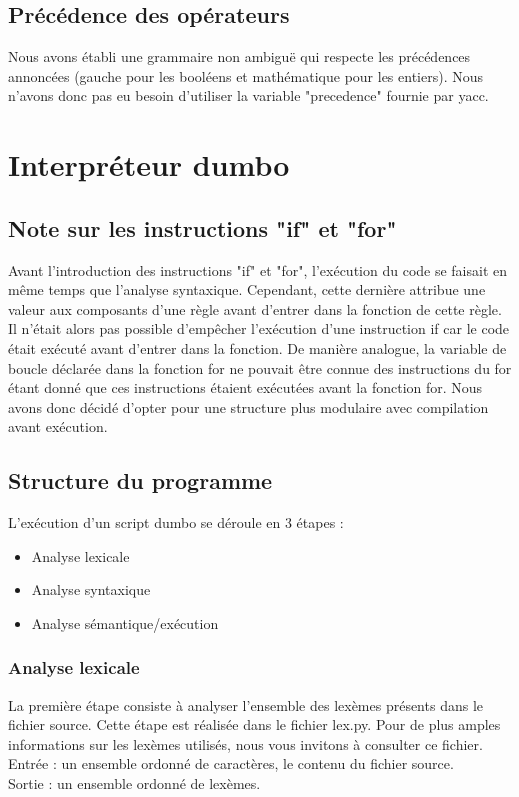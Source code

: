 \documentclass[10pt,a4paper]{article}
\begin{document}
	\subsection{Précédence des opérateurs}
	Nous avons établi une grammaire non ambiguë qui respecte les précédences annoncées (gauche pour les booléens et mathématique pour les entiers). Nous n'avons donc pas eu besoin d'utiliser la variable "precedence" fournie par yacc.
	
	\newpage
	\section{Interpréteur dumbo}
	
	\subsection{Note sur les instructions "if" et "for"}
	Avant l'introduction des instructions "if" et "for", l'exécution du code se faisait en même temps que l'analyse syntaxique.
	Cependant, cette dernière attribue une valeur aux composants d'une règle avant d'entrer dans la fonction de cette règle.
	Il n'était alors pas possible d'empêcher l'exécution d'une instruction if car le code était exécuté avant d'entrer dans la fonction.
	De manière analogue, la variable de boucle déclarée dans la fonction for ne pouvait être connue des instructions du for étant donné que ces instructions étaient exécutées avant la fonction for.
	Nous avons donc décidé d'opter pour une structure plus modulaire avec compilation avant exécution.
	
	\subsection{Structure du programme}
	
	L'exécution d'un script dumbo se déroule en 3 étapes :
	\begin{itemize}
		\item Analyse lexicale
		\item Analyse syntaxique
		\item Analyse sémantique/exécution
	\end{itemize}
	
	\subsubsection{Analyse lexicale}
	La première étape consiste à analyser l'ensemble des lexèmes présents dans le fichier source.
	Cette étape est réalisée dans le fichier lex.py. Pour de plus amples informations sur les lexèmes utilisés, nous vous invitons à consulter ce fichier.\\
	Entrée : un ensemble ordonné de caractères, le contenu du fichier source.\\
	Sortie : un ensemble ordonné de lexèmes.
	
\end{document}
